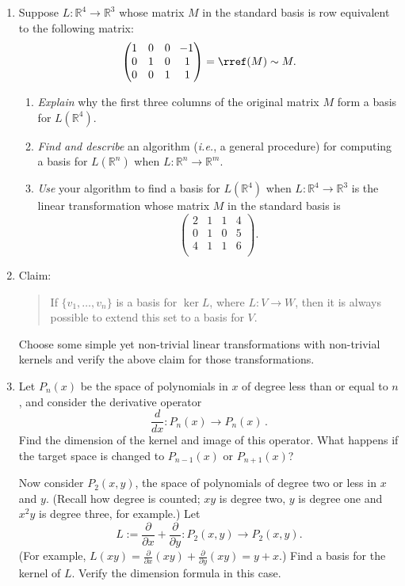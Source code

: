 \begin{enumerate}

\item Suppose $L \colon \mathbb{R}^4\rightarrow \mathbb{R}^3$ whose matrix $M$ in the standard basis is row equivalent to the following matrix:
\[
\begin{pmatrix}
1&0&0&\!-1\\
0&1&0&1\\
0&0&1&1\\
\end{pmatrix}=\rref(M)\sim M.
\]
\begin{enumerate}
\item \emph{Explain} why the first three columns of the original matrix $M$ form a basis for $L(\mathbb{R}^4)$.
\item \emph{Find and describe} an algorithm (\textit{i.e.}, a general procedure) for computing a basis for $L(\mathbb{R}^n)$ when $L \colon \mathbb{R}^n\rightarrow \mathbb{R}^m$. 
\item{\itshape Use} your algorithm to find a basis for \(L(\mathbb{R}^4)\) when \(L \colon \mathbb{R}^4 \to \mathbb{R}^3\) is the linear transformation whose matrix \(M\) in the standard basis is
\[
\begin{pmatrix}
2&1&1&4\\
0&1&0&5\\
4&1&1&6\\
\end{pmatrix}.
\]
\end{enumerate}


\item Claim: 
\begin{quote}If $\{v_1, \ldots, v_n  \}$ is a basis for $\ker L$, where $L \colon V\rightarrow W$, then it is always possible to extend this set to a basis for $V$.\end{quote}  
Choose some simple yet non-trivial linear transformations with non-trivial kernels and verify the above claim for those transformations.


\item Let $P_n(x)$ be the space of polynomials in $x$ of degree less than or equal to $n$, and consider the derivative operator \[\frac{d}{dx}:P_n(x)\to P_n(x)\, .\] %
Find the dimension of the kernel and image of this operator. What happens if the target space is changed to $P_{n-1}(x)$ or $P_{n+1}(x)$?

Now consider $P_2(x,y)$, the space of polynomials of degree two or less in $x$ and $y$.  (Recall how degree is counted; $xy$ is degree two, $y$ is degree one and $x^2y$ is degree three, for example.)  Let 
\[L:=\frac{\partial}{\partial x}+\frac{\partial}{\partial y}:P_2(x,y) \to P_2(x,y).\]  
(For example, $L(xy)=\frac{\partial}{\partial x}(xy)+\frac{\partial}{\partial y}(xy) = y+x$.)  Find a basis for the kernel of $L$.  Verify the dimension formula in this case.


\end{enumerate}
